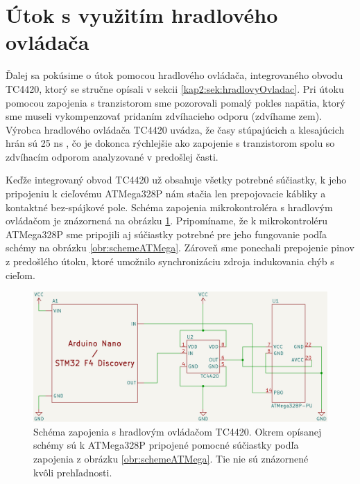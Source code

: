 \section{Útok s využitím hradlového ovládača} \label{kap3:sek:hradlovyOvladac}
Ďalej sa pokúsime o útok pomocou hradlového ovládača, integrovaného obvodu TC4420, ktorý se stručne opísali v sekcii \ref{kap2:sek:hradlovyOvladac}. Pri útoku pomocou zapojenia s tranzistorom sme pozorovali pomalý pokles napätia, ktorý sme museli vykompenzovať pridaním zdvíhacieho odporu (zdvíhame zem). Výrobca hradlového ovládača TC4420 uvádza, že časy stúpajúcich a klesajúcich hrán sú 25 ns \cite{gateDriver}, čo je dokonca rýchlejšie ako zapojenie s tranzistorom spolu so zdvíhacím odporom analyzované v predošlej časti.

Keďže integrovaný obvod TC4420 už obsahuje všetky potrebné súčiastky, k jeho pripojeniu k cieľovému ATMega328P nám stačia len prepojovacie kábliky a kontaktné bez-spájkové pole. Schéma zapojenia mikrokontroléra s hradlovým ovládačom je znázornená na obrázku \ref{obr:schemeGateDriver}. Pripomíname, že k mikrokontroléru ATMega328P sme pripojili aj súčiastky potrebné pre jeho fungovanie podľa schémy na obrázku \ref{obr:schemeATMega}. Zároveň sme ponechali prepojenie pinov z predošlého útoku, ktoré umožnilo synchronizáciu zdroja indukovania chýb s cieľom.

\begin{figure}
    \centerline{\includegraphics[width=1\textwidth]{images/schemeGateDriver.png}}
    \caption[Schéma zapojenia s hradlovým ovládačom TC4420]{Schéma zapojenia s hradlovým ovládačom TC4420. Okrem opísanej schémy sú k ATMega328P pripojené pomocné súčiastky podľa zapojenia z obrázku \ref{obr:schemeATMega}. Tie nie sú znázornené kvôli prehľadnosti.}
    \label{obr:schemeGateDriver}
\end{figure}

